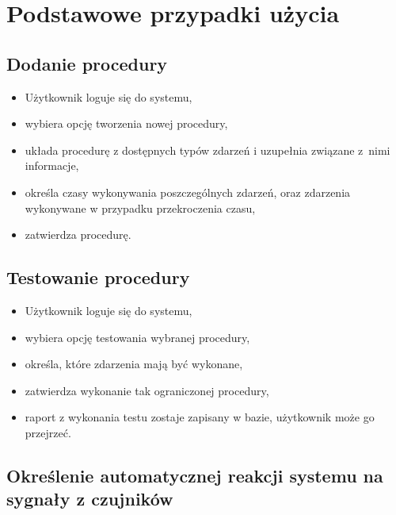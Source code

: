 \documentclass[a4paper,12pt]{article}
\begin{document}

\section{Podstawowe przypadki użycia}

\subsection{Dodanie procedury}

\begin{itemize}
	\item Użytkownik loguje się do systemu,

	\item wybiera opcję tworzenia nowej procedury,

	\item układa procedurę z dostępnych typów zdarzeń i uzupełnia związane z~nimi informacje,

	\item określa czasy wykonywania poszczególnych zdarzeń, oraz zdarzenia wykonywane w przypadku przekroczenia czasu,

	\item zatwierdza procedurę.
\end{itemize}

\subsection{Testowanie procedury}

\begin{itemize}
	\item Użytkownik loguje się do systemu,

	\item wybiera opcję testowania wybranej procedury,

	\item określa, które zdarzenia mają być wykonane,

	\item zatwierdza wykonanie tak ograniczonej procedury,

	\item raport z wykonania testu zostaje zapisany w bazie, użytkownik może go przejrzeć.
\end{itemize}

\subsection{Określenie automatycznej reakcji systemu na sygnały z czujników}
\end{document}
